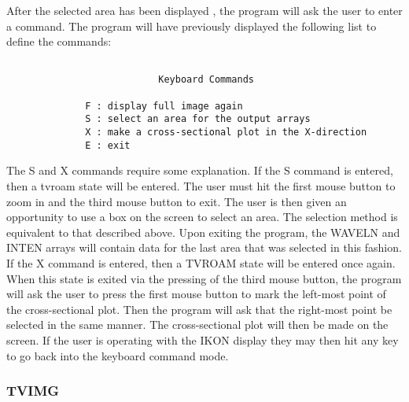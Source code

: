       After the selected area has been displayed , the program
   will ask the user to enter a  command.  The program will have
   previously displayed the following list to define the 
   commands:
\begin{verbatim}   

                           Keyboard Commands 

              F : display full image again                       
              S : select an area for the output arrays           
              X : make a cross-sectional plot in the X-direction 
              E : exit                                           
\end{verbatim}          
   
      The S and X commands require some explanation.  If the S command is
   entered, then a tvroam state will be entered.  The user must hit the
   first mouse button to zoom in and the third mouse button to exit.  The
   user is then given an opportunity to use a box on the screen
   to select an area.  The selection method is equivalent to that
   described above.  Upon exiting the program, the WAVELN and INTEN arrays
   will contain data for the last area that was selected in this fashion.
   If the X command is entered, then a TVROAM state will be entered once
   again.  When this state is exited via the pressing of the third mouse
   button, the program will ask the user to press the first mouse button
   to mark the left-most point of the cross-sectional plot.  Then the
   program will ask that the right-most point be selected in the same
   manner.  The cross-sectional plot will then be made on the 
   screen.  If the user is operating with the IKON display they may then hit 
   any key to go back into the keyboard command mode. 

\subsubsection{TVIMG}

